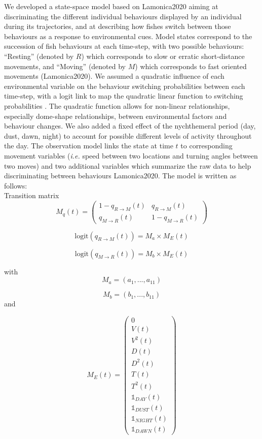 \documentclass[
  letterpaper,
  DIV=11,
  numbers=noendperiod]{scrartcl}
\begin{document}
We developed a state-space model based on Lamonica2020 aiming at
discriminating the different individual behaviours displayed by an
individual during its trajectories, and at describing how fishes switch
between those behaviours as a response to environmental cues. Model
states correspond to the succession of fish behaviours at each
time-step, with two possible behaviours: ``Resting'' (denoted by \(R\))
which corresponds to slow or erratic short-distance movements, and
``Moving'' (denoted by \(M\)) which corresponds to fast oriented
movements (Lamonica2020). We assumed a quadratic influence of each
environmental variable on the behaviour switching probabilities between
each time-step, with a logit link to map the quadratic linear function
to switching probabilities . The quadratic function allows for
non-linear relationships, especially dome-shape relationships, between
environmental factors and behaviour changes. We also added a fixed
effect of the nychthemeral period (day, dust, dawn, night) to account
for possible different levels of activity throughout the day. The
observation model links the state at time \(t\) to corresponding
movement variables (\emph{i.e.} speed between two locations and turning
angles between two moves) and two additional variables which summarize
the raw data to help discriminating between behaviours Lamonica2020. The
model is written as follows:\\
Transition matrix \[M_{q}(t)=
\begin{pmatrix}
   1-q_{R \rightarrow M}(t) &q_{R \rightarrow M}(t) \\
   q_{M \rightarrow R}(t)&1-q_{M \rightarrow R}(t) 
\end{pmatrix}\]

\[\text{logit}(q_{R \rightarrow M}(t)) = M_{a} \times M_{E}(t)\]

\[\text{logit}(q_{M \rightarrow R}(t)) = M_{b} \times M_{E}(t)\]

with \[M_{a}=(a_{1}, ..., a_{11})\]

\[M_{b}=(b_{1}, ..., b_{11})\] and

\[M_{E}(t)=
\begin{pmatrix}
   0 \\
   V(t) \\
   V^2(t) \\
   D(t) \\
   D^2(t) \\
   T(t) \\
   T^2(t) \\
   \mathbb{1}_{DAY}(t) \\
   \mathbb{1}_{DUST}(t) \\
   \mathbb{1}_{NIGHT}(t) \\
   \mathbb{1}_{DAWN}(t)
\end{pmatrix}\]
\end{document}
